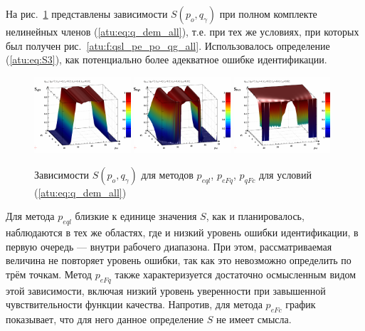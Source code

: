 На рис.~\ref{atu:f:qsl_S_po_qg_all} представлены зависимости $S(p_o,q_\gamma)$
при полном комплекте нелинейных членов (\ref{atu:eq:q_dem_all}),
т.е. при тех же условиях, при которых был получен рис.~\ref{atu:f:qsl_pe_po_qg_all}.
Использовалось определение (\ref{atu:eq:S3}), как потенциально более
адекватное ошибке идентификации.

\begin{figure}[htb!]
  \centerline{
    \includegraphics[width=0.32\textwidth]{p/qls_pe-p_po_qg_Sql_all.png}
    \hfill
    \includegraphics[width=0.32\textwidth]{p/qls_pe-p_po_qg_SFq_all.png}
    \hfill
    \includegraphics[width=0.32\textwidth]{p/qls_pe-p_po_qg_SFc_all.png}
  }
  \caption{Зависимости $S(p_o,q_\gamma)$ для методов $p_{eql}$, $p_{eFq}$, $p_{qFc}$ для условий (\ref{atu:eq:q_dem_all})}
  \label{atu:f:qsl_S_po_qg_all}
\end{figure}

Для метода $p_{eql}$ близкие к единице значения $S$, как и планировалось,
наблюдаются в тех же областях, где и низкий уровень ошибки идентификации,
в первую очередь --- внутри рабочего диапазона. При этом,
рассматриваемая величина не повторяет уровень ошибки, так как
это невозможно определить по трём точкам. Метод
$p_{eFq}$ также характеризуется достаточно осмысленным видом этой зависимости,
включая низкий уровень уверенности при завышенной чувствительности функции качества.
Напротив, для метода $p_{eFc}$ график показывает, что для него
данное определение $S$ не имеет смысла.


